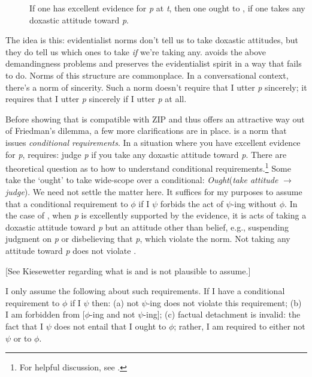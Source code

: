 \documentclass[12pt]{article}
\begin{document}
\begin{description}
    \item[\eoc] If one has excellent evidence for \textit{p} at \textit{t}, then one ought to \jud{}, if one takes any doxastic attitude toward \textit{p}.
\end{description}
%
The idea is this: evidentialist norms don't tell us to take doxastic attitudes, but they do tell us which ones to take \textit{if} we're taking any. \eoc{} avoids the above demandingness problems and preserves the evidentialist spirit in a way that \ep{} fails to do. Norms of this structure are commonplace. In a conversational context, there's a norm of sincerity. Such a norm doesn't require that I utter \textit{p} sincerely; it requires that I utter \textit{p} sincerely if I utter \textit{p} at all.

Before showing that \eoc{} is compatible with ZIP and thus offers an attractive way out of Friedman's dilemma, a few more clarifications are in place. \eoc{} is a norm that issues \textit{conditional requirements}. In a situation where you have excellent evidence for \textit{p}, \eoc{} requires: judge \textit{p} if you take any doxastic attitude toward \textit{p}. There are theoretical question as to how to understand conditional requirements.\footnote{For helpful discussion, see \textcite[ch.~3]{kiesewetter_normativity_2017}.} Some take the `ought' to take wide-scope over a conditional: \textit{Ought}(\textit{take attitude} $\rightarrow$ \textit{judge}). We need not settle the matter here. It suffices for my purposes to assume that a conditional requirement to $\phi$ if I $\psi$ forbids the act of $\psi$-ing without $\phi$. In the case of \eoc{}, when \textit{p} is excellently supported by the evidence, it is acts of taking a doxastic attitude toward \textit{p} but an attitude other than belief, e.g., suspending judgment on \textit{p} or disbelieving that \textit{p}, which violate the norm. Not taking any attitude toward \textit{p} does not violate \eoc{}.

[See Kiesewetter regarding what is and is not plausible to assume.]

I only assume the following about such requirements. If I have a conditional requirement to $\phi$ if I $\psi$ then: (a) not $\psi$-ing does not violate this requirement; (b) I am forbidden from [$\phi$-ing and not $\psi$-ing]; (c) factual detachment is invalid: the fact that I $\psi$ does not entail that I ought to $\phi$; rather, I am required to either not $\psi$ or to $\phi$.
\end{document}
